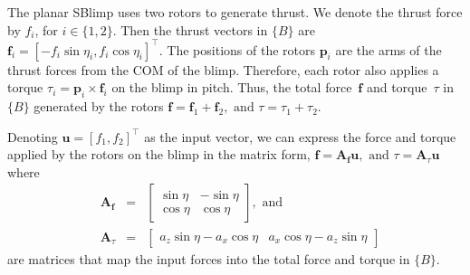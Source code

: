 \documentclass[conference]{ieeeconf}
\newcommand{\david}[1]{{\color{blue}#1}}
\begin{document}
The planar SBlimp uses two rotors to generate thrust.
We denote the thrust force by $f_i$, for $i\in\{1,2\}$. Then the thrust vectors in $\{B\}$ are
$\boldsymbol{f}_{i} = [-f_{i}\sin{\eta_i}, f_{i}\cos{\eta_i}]^\top.$
The positions of the rotors $\boldsymbol{p}_i$ are the arms of the thrust forces from the COM of the blimp. Therefore, each rotor also applies a torque $\tau_{i} = \boldsymbol{p}_{i}\times\boldsymbol{f}_{i}
$ 
on the blimp in pitch. Thus, the total force~$\boldsymbol{f}$ and torque~$\tau$ in~$\{B\}$ generated by the rotors $
    \boldsymbol{f} = \boldsymbol{f}_{1} + \boldsymbol{f}_{2}, \text{ and }
    \tau = \tau_{1} + \tau_{2}.$

Denoting $\boldsymbol{u} = \left[f_{1}, f_{2}\right]^{\top}$ as the input vector, we can express the force and torque applied by the rotors on the blimp in the matrix form,
$
    \boldsymbol{f} = \boldsymbol{A_f}\boldsymbol{u}, \text{ and }
    \tau = \boldsymbol{A}_\tau\boldsymbol{u}
$
where %
\begin{equation}
\begin{aligned}
    &\boldsymbol{A_f}%
    &=&
    \begin{bmatrix}
        \sin{\eta} & -\sin{\eta}\\
        \cos{\eta} & \cos{\eta}
    \end{bmatrix}, \text{ and }\\
    &\boldsymbol{A}_\tau%
    &=& 
    \begin{bmatrix}
        a_z\!\sin{\eta}\!-\!a_x\!\cos{\eta} &
        a_x\!\cos{\eta}\!-\!a_z\!\sin{\eta}
    \end{bmatrix}
\end{aligned}
\label{eq:Acomponents}
\end{equation}
are matrices that map the input forces into the total force and torque in $\{B\}$.
\end{document}
